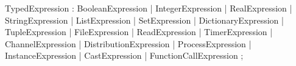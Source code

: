 %
%
%
\begin{rail}
TypedExpression : BooleanExpression
                | IntegerExpression
                | RealExpression
                | StringExpression
                | ListExpression
                | SetExpression
                | DictionaryExpression
                | TupleExpression
                | FileExpression
                | ReadExpression
                | TimerExpression
                | ChannelExpression
                | DistributionExpression
                | ProcessExpression
                | InstanceExpression
                | CastExpression
                | FunctionCallExpression
                ;
\end{rail}
